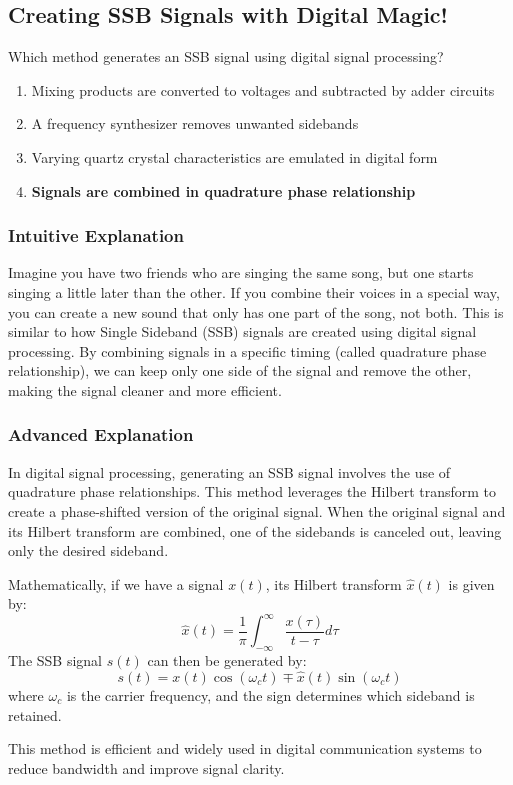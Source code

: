 \subsection{Creating SSB Signals with Digital Magic!}
\label{sec:E7F04}

\begin{tcolorbox}[colback=gray!10!white,colframe=black!75!black,title=\textbf{E7F04}]
Which method generates an SSB signal using digital signal processing?
\begin{enumerate}[label=\Alph*.]
    \item Mixing products are converted to voltages and subtracted by adder circuits
    \item A frequency synthesizer removes unwanted sidebands
    \item Varying quartz crystal characteristics are emulated in digital form
    \item \textbf{Signals are combined in quadrature phase relationship}
\end{enumerate}
\end{tcolorbox}

\subsubsection{Intuitive Explanation}
Imagine you have two friends who are singing the same song, but one starts singing a little later than the other. If you combine their voices in a special way, you can create a new sound that only has one part of the song, not both. This is similar to how Single Sideband (SSB) signals are created using digital signal processing. By combining signals in a specific timing (called quadrature phase relationship), we can keep only one side of the signal and remove the other, making the signal cleaner and more efficient.

\subsubsection{Advanced Explanation}
In digital signal processing, generating an SSB signal involves the use of quadrature phase relationships. This method leverages the Hilbert transform to create a phase-shifted version of the original signal. When the original signal and its Hilbert transform are combined, one of the sidebands is canceled out, leaving only the desired sideband.

Mathematically, if we have a signal \( x(t) \), its Hilbert transform \( \hat{x}(t) \) is given by:
\[
\hat{x}(t) = \frac{1}{\pi} \int_{-\infty}^{\infty} \frac{x(\tau)}{t - \tau} d\tau
\]
The SSB signal \( s(t) \) can then be generated by:
\[
s(t) = x(t) \cos(\omega_c t) \mp \hat{x}(t) \sin(\omega_c t)
\]
where \( \omega_c \) is the carrier frequency, and the sign determines which sideband is retained.

This method is efficient and widely used in digital communication systems to reduce bandwidth and improve signal clarity.


